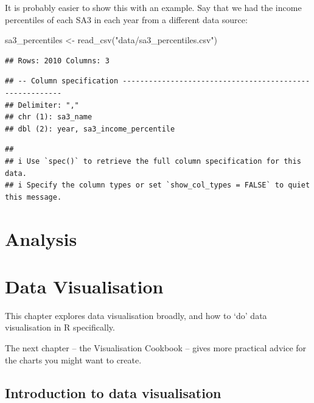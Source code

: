 \documentclass[
]{book}
\newenvironment{Shaded}{\begin{snugshade}}{\end{snugshade}}
\newcommand{\FunctionTok}[1]{\textcolor[rgb]{0.00,0.00,0.00}{#1}}
\newcommand{\NormalTok}[1]{#1}
\newcommand{\OtherTok}[1]{\textcolor[rgb]{0.56,0.35,0.01}{#1}}
\newcommand{\StringTok}[1]{\textcolor[rgb]{0.31,0.60,0.02}{#1}}
\begin{document}
It is probably easier to show this with an example. Say that we had the income percentiles of each SA3 in each year from a different data source:

\begin{Shaded}
\begin{Highlighting}[]
\NormalTok{sa3\_percentiles }\OtherTok{\textless{}{-}} \FunctionTok{read\_csv}\NormalTok{(}\StringTok{"data/sa3\_percentiles.csv"}\NormalTok{)}
\end{Highlighting}
\end{Shaded}

\begin{verbatim}
## Rows: 2010 Columns: 3
\end{verbatim}

\begin{verbatim}
## -- Column specification --------------------------------------------------------
## Delimiter: ","
## chr (1): sa3_name
## dbl (2): year, sa3_income_percentile
\end{verbatim}

\begin{verbatim}
## 
## i Use `spec()` to retrieve the full column specification for this data.
## i Specify the column types or set `show_col_types = FALSE` to quiet this message.
\end{verbatim}

\hypertarget{analysis}{%
\chapter{Analysis}\label{analysis}}

\hypertarget{data-visualisation}{%
\chapter{Data Visualisation}\label{data-visualisation}}

This chapter explores data visualisation broadly, and how to `do' data visualisation in R specifically.

The next chapter -- the Visualisation Cookbook -- gives more practical advice for the charts you might want to create.

\hypertarget{introduction-to-data-visualisation}{%
\section{Introduction to data visualisation}\label{introduction-to-data-visualisation}}
\end{document}
